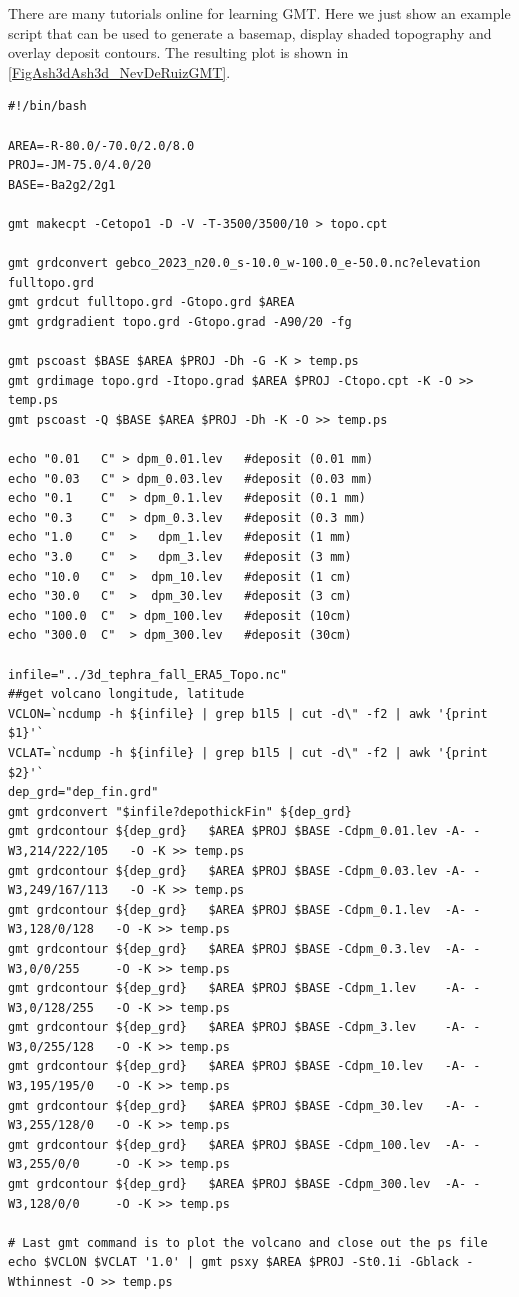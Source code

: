 There are many tutorials online for learning GMT. Here we just show an example script
that can be used to generate a basemap, display shaded topography and overlay
deposit contours.  The resulting plot is shown in 
\ref{FigAsh3dAsh3d_NevDeRuizGMT}.

\footnotesize
\begin{verbatim}
#!/bin/bash

AREA=-R-80.0/-70.0/2.0/8.0
PROJ=-JM-75.0/4.0/20
BASE=-Ba2g2/2g1

gmt makecpt -Cetopo1 -D -V -T-3500/3500/10 > topo.cpt

gmt grdconvert gebco_2023_n20.0_s-10.0_w-100.0_e-50.0.nc?elevation fulltopo.grd
gmt grdcut fulltopo.grd -Gtopo.grd $AREA
gmt grdgradient topo.grd -Gtopo.grad -A90/20 -fg

gmt pscoast $BASE $AREA $PROJ -Dh -G -K > temp.ps
gmt grdimage topo.grd -Itopo.grad $AREA $PROJ -Ctopo.cpt -K -O >> temp.ps
gmt pscoast -Q $BASE $AREA $PROJ -Dh -K -O >> temp.ps

echo "0.01   C" > dpm_0.01.lev   #deposit (0.01 mm)
echo "0.03   C" > dpm_0.03.lev   #deposit (0.03 mm)
echo "0.1    C"  > dpm_0.1.lev   #deposit (0.1 mm)
echo "0.3    C"  > dpm_0.3.lev   #deposit (0.3 mm)
echo "1.0    C"  >   dpm_1.lev   #deposit (1 mm)
echo "3.0    C"  >   dpm_3.lev   #deposit (3 mm)
echo "10.0   C"  >  dpm_10.lev   #deposit (1 cm)
echo "30.0   C"  >  dpm_30.lev   #deposit (3 cm)
echo "100.0  C"  > dpm_100.lev   #deposit (10cm)
echo "300.0  C"  > dpm_300.lev   #deposit (30cm)

infile="../3d_tephra_fall_ERA5_Topo.nc"
##get volcano longitude, latitude
VCLON=`ncdump -h ${infile} | grep b1l5 | cut -d\" -f2 | awk '{print $1}'`
VCLAT=`ncdump -h ${infile} | grep b1l5 | cut -d\" -f2 | awk '{print $2}'`
dep_grd="dep_fin.grd"
gmt grdconvert "$infile?depothickFin" ${dep_grd}
gmt grdcontour ${dep_grd}   $AREA $PROJ $BASE -Cdpm_0.01.lev -A- -W3,214/222/105   -O -K >> temp.ps
gmt grdcontour ${dep_grd}   $AREA $PROJ $BASE -Cdpm_0.03.lev -A- -W3,249/167/113   -O -K >> temp.ps
gmt grdcontour ${dep_grd}   $AREA $PROJ $BASE -Cdpm_0.1.lev  -A- -W3,128/0/128   -O -K >> temp.ps
gmt grdcontour ${dep_grd}   $AREA $PROJ $BASE -Cdpm_0.3.lev  -A- -W3,0/0/255     -O -K >> temp.ps
gmt grdcontour ${dep_grd}   $AREA $PROJ $BASE -Cdpm_1.lev    -A- -W3,0/128/255   -O -K >> temp.ps
gmt grdcontour ${dep_grd}   $AREA $PROJ $BASE -Cdpm_3.lev    -A- -W3,0/255/128   -O -K >> temp.ps
gmt grdcontour ${dep_grd}   $AREA $PROJ $BASE -Cdpm_10.lev   -A- -W3,195/195/0   -O -K >> temp.ps
gmt grdcontour ${dep_grd}   $AREA $PROJ $BASE -Cdpm_30.lev   -A- -W3,255/128/0   -O -K >> temp.ps
gmt grdcontour ${dep_grd}   $AREA $PROJ $BASE -Cdpm_100.lev  -A- -W3,255/0/0     -O -K >> temp.ps
gmt grdcontour ${dep_grd}   $AREA $PROJ $BASE -Cdpm_300.lev  -A- -W3,128/0/0     -O -K >> temp.ps

# Last gmt command is to plot the volcano and close out the ps file
echo $VCLON $VCLAT '1.0' | gmt psxy $AREA $PROJ -St0.1i -Gblack -Wthinnest -O >> temp.ps

\end{verbatim}
\normalsize



